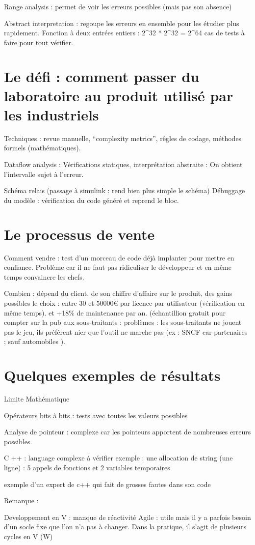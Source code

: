 \documentclass[a4paper,12pt]{article}
\begin{document}
Range analysis : permet de voir les erreurs possibles (mais pas son absence)

Abstract interpretation : regoupe les erreurs en ensemble pour les étudier plus rapidement.
Fonction à deux entrées entiers : 2^32 * 2^32 = 2^64 cas de tests à faire pour tout vérifier.
\section{Le défi : comment passer du laboratoire au produit utilisé par les industriels} 

Techniques : revue manuelle, ``complexity metrics'', rêgles de codage, méthodes formels (mathématiques).

Dataflow analysis :
Vérifications statiques, 
interprétation abstraite :
On obtient l'intervalle sujet à l'erreur.



Schéma relais (passage à simulink : rend bien plus simple le schéma) 
Débuggage du modèle : vérification du code généré et reprend le bloc.

\section{Le processus de vente}

Comment vendre : test d'un morceau de code déjà implanter pour mettre en confiance. Problème car il ne faut pas ridiculiser le développeur et en même temps convaincre les chefs.

Combien : dépend du client, de son chiffre d'affaire sur le produit, des gains possibles 
le choix : entre 30 et 50000€ par licence par utilisateur (vérification en même temps).
et +18\% de maintenance par an. (échantillion gratuit pour compter sur la pub aux sous-traitants : problèmes : les sous-traitants ne jouent pas le jeu, ils préférent nier que l'outil ne marche pas (ex : SNCF car partenaires ; sauf automobiles ).



\section{Quelques exemples de résultats}
Limite Mathématique

Opérateurs bits à bits : tests avec toutes les valeurs possibles

Analyse de pointeur : complexe car les pointeurs apportent de nombreuses erreurs possibles.


C ++ :
language complexe à vérifier  
exemple : une allocation de string (une ligne) : 5 appels de fonctions et 2 variables temporaires

exemple d'un expert de c++ qui fait de grosses fautes dans son code




Remarque : 

Developpement en V : manque de réactivité 
Agile : utile mais il y a parfois besoin d'un socle fixe que l'on n'a pas à changer.
Dans la pratique, il s'agit de plusieurs cycles en V (W)
\end{document}
